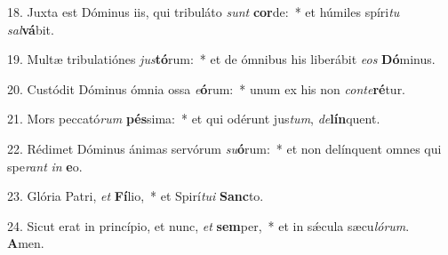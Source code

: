 18. Juxta est Dóminus iis, qui tribuláto \textit{sunt} \textbf{cor}de:~*  et húmiles spíri\textit{tu} \textit{sal}\textbf{vá}bit.\

19. Multæ tribulatiónes \textit{jus}\textbf{tó}rum:~*  et de ómnibus his liberábit \textit{e}\textit{os} \textbf{Dó}minus.\

20. Custódit Dóminus ómnia ossa \textit{e}\textbf{ó}rum:~*  unum ex his non \textit{con}\textit{te}\textbf{ré}tur.\

21. Mors peccató\textit{rum} \textbf{pés}sima:~*  et qui odérunt jus\textit{tum}, \textit{de}\textbf{lín}quent.\

22. Rédimet Dóminus ánimas servórum \textit{su}\textbf{ó}rum:~*  et non delínquent omnes qui spe\textit{rant} \textit{in} \textbf{e}o.\

23. Glória Patri, \textit{et} \textbf{Fí}lio,~*  et Spirí\textit{tu}\textit{i} \textbf{Sanc}to.\

24. Sicut erat in princípio, et nunc, \textit{et} \textbf{sem}per,~*  et in sǽcula sæcu\textit{ló}\textit{rum}. \textbf{A}men.\

